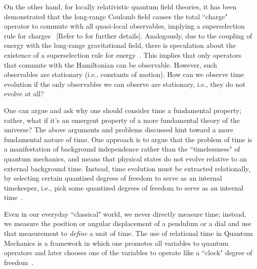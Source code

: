 On the other hand, for locally relativistic quantum field theories, it has been demonstrated that the 
long-range Coulomb field causes the total ``charge" operator to commute with all quasi-local observables, 
implying a superselection rule for charges~\cite{Strocchi:1974xh} [Refer to  
for further details]. Analogously, due to the coupling of energy with the long-range gravitational 
field, there is speculation about the existence of a superselection rule for energy~\cite{page1983evolution}. 
This implies that only operators that commute with the Hamiltonian can be observable. However, such 
observables are stationary (i.e., constants of motion). How can we observe time evolution if the 
only observables we can observe are stationary, i.e., they do not evolve at all?

One can argue and ask why one should consider time a fundamental property; rather, what if 
it's an emergent property of a more fundamental theory of the universe? The above arguments and 
problems discussed hint toward a more fundamental nature of time. One approach is to argue that 
the problem of time is a manifestation of background independence rather than the ``timelessness" 
of quantum mechanics, and means that physical states do not evolve relative to an external background 
time. Instead, time evolution must be extracted relationally, by selecting certain quantized degrees 
of freedom to serve as an internal timekeeper, i.e., pick some quantized degrees of freedom to serve 
as an internal time~\cite{hohn2021trinity}.

Even in our everyday ``classical" world, we never directly measure time; instead, we measure the 
position or angular displacement of a pendulum or a dial and use that measurement to \emph{define} a 
unit of time. The use of relational time in Quantum Mechanics is a framework in which one promotes 
all variables to quantum operators and later chooses one of the variables to operate like a    
``clock" degree of freedom~\cite{gambini2006relational}.

